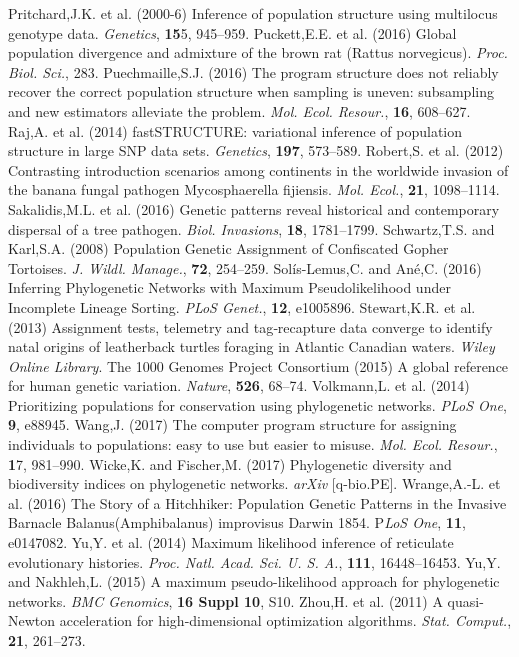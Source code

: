 \documentclass{bioinfo}
\begin{document}
\begin{thebibliography}{}
\bibitem[a ()]{}Pritchard,J.K. et al. (2000-6) Inference of population structure using multilocus genotype data. \textit{Genetics}, \textbf{15}5, 945–959.
\bibitem[a ()]{}Puckett,E.E. et al. (2016) Global population divergence and admixture of the brown rat (Rattus norvegicus). \textit{Proc. Biol. Sci.}, 283.
\bibitem[a ()]{}Puechmaille,S.J. (2016) The program structure does not reliably recover the correct population structure when sampling is uneven: subsampling and new estimators alleviate the problem. \textit{Mol. Ecol. Resour.}, \textbf{16}, 608–627.
\bibitem[a ()]{}Raj,A. et al. (2014) fastSTRUCTURE: variational inference of population structure in large SNP data sets. \textit{Genetics}, \textbf{197}, 573–589.
\bibitem[a ()]{}Robert,S. et al. (2012) Contrasting introduction scenarios among continents in the worldwide invasion of the banana fungal pathogen Mycosphaerella fijiensis. \textit{Mol. Ecol.}, \textbf{21}, 1098–1114.
\bibitem[a ()]{}Sakalidis,M.L. et al. (2016) Genetic patterns reveal historical and contemporary dispersal of a tree pathogen. \textit{Biol. Invasions}, \textbf{18}, 1781–1799.
\bibitem[a ()]{}Schwartz,T.S. and Karl,S.A. (2008) Population Genetic Assignment of Confiscated Gopher Tortoises. \textit{J. Wildl. Manage.}, \textbf{72}, 254–259.
\bibitem[a ()]{}Solís-Lemus,C. and Ané,C. (2016) Inferring Phylogenetic Networks with Maximum Pseudolikelihood under Incomplete Lineage Sorting. \textit{PLoS Genet.}, \textbf{12}, e1005896.
\bibitem[a ()]{}Stewart,K.R. et al. (2013) Assignment tests, telemetry and tag‐recapture data converge to identify natal origins of leatherback turtles foraging in Atlantic Canadian waters. \textit{Wiley Online Library}.
\bibitem[a ()]{}The 1000 Genomes Project Consortium (2015) A global reference for human genetic variation. \textit{Nature}, \textbf{526}, 68–74.
\bibitem[a ()]{}Volkmann,L. et al. (2014) Prioritizing populations for conservation using phylogenetic networks. \textit{PLoS One}, \textbf{9}, e88945.
\bibitem[a ()]{}Wang,J. (2017) The computer program structure for assigning individuals to populations: easy to use but easier to misuse. \textit{Mol. Ecol. Resour.}, \textbf{1}7, 981–990.
\bibitem[a ()]{}Wicke,K. and Fischer,M. (2017) Phylogenetic diversity and biodiversity indices on phylogenetic networks. \textit{arXiv }[q-bio.PE].
\bibitem[a ()]{}Wrange,A.-L. et al. (2016) The Story of a Hitchhiker: Population Genetic Patterns in the Invasive Barnacle Balanus(Amphibalanus) improvisus Darwin 1854. P\textit{LoS One}, \textbf{11}, e0147082.
\bibitem[a ()]{}Yu,Y. et al. (2014) Maximum likelihood inference of reticulate evolutionary histories. \textit{Proc. Natl. Acad. Sci. U. S. A.}, \textbf{111}, 16448–16453.
\bibitem[a ()]{}Yu,Y. and Nakhleh,L. (2015) A maximum pseudo-likelihood approach for phylogenetic networks. \textit{BMC Genomics}, \textbf{16 Suppl 10}, S10.
\bibitem[a ()]{}Zhou,H. et al. (2011) A quasi-Newton acceleration for high-dimensional optimization algorithms. \textit{Stat. Comput.}, \textbf{21}, 261–273.

\end{thebibliography}
\end{document}
